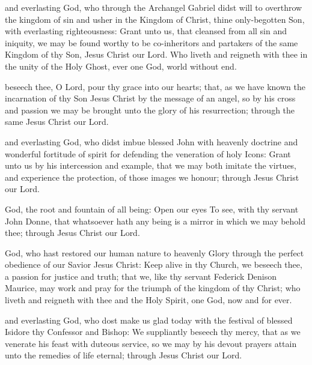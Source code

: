  and everlasting God, who through the Archangel Gabriel didst will to overthrow the kingdom of sin and usher in the Kingdom of Christ, thine only-begotten Son, with everlasting righteousness: Grant unto us, that cleansed from all sin and iniquity, we may be found worthy to be co-inheritors and partakers of the same Kingdom of thy Son, Jesus Christ our Lord. Who liveth and reigneth with thee in the unity of the Holy Ghost, ever one God, world without end.

 beseech thee, O Lord, pour thy grace into our hearts; that, as we have known the incarnation of thy Son Jesus Christ by the message of an angel, so by his cross and passion we may be brought unto the glory of his resurrection; through the same Jesus Christ our Lord.

 and everlasting God, who didst imbue blessed John with heavenly doctrine and wonderful fortitude of spirit for defending the veneration of holy Icons: Grant unto us by his intercession and example, that we may both imitate the virtues, and experience the protection, of those images we honour; through Jesus Christ our Lord.

 God, the root and fountain of all being: Open our eyes To see, with thy servant John Donne, that whatsoever hath any being is a mirror in which we may behold thee; through Jesus Christ our Lord.

 God, who hast restored our human nature to heavenly Glory through the perfect obedience of our Savior Jesus Christ: Keep alive in thy Church, we beseech thee, a passion for justice and truth; that we, like thy servant Federick Denison Maurice, may work and pray for the triumph of the kingdom of thy Christ; who liveth and reigneth with thee and the Holy Spirit, one God, now and for ever.

 and everlasting God, who dost make us glad today with the festival of blessed Isidore thy Confessor and Bishop: We suppliantly beseech thy mercy, that as we venerate his feast with duteous service, so we may by his devout prayers attain unto the remedies of life eternal; through Jesus Christ our Lord.

